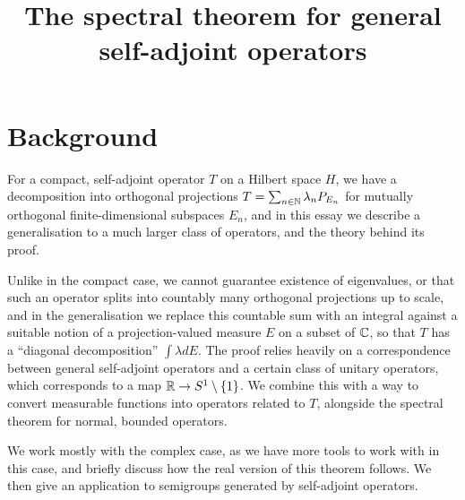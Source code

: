 \documentclass[10pt]{amsart}
\title{The spectral theorem for general self-adjoint operators}
\begin{document}
\maketitle
\section{Background}


For a compact, self-adjoint operator $T$ on a Hilbert space $H$, we have a decomposition into orthogonal projections $T = \sum_{n \in \mathbb{N}}\lambda_n P_{E_n}$ for mutually orthogonal finite-dimensional subspaces $E_n$, and in this essay we describe a generalisation to a much larger class of operators, and the theory behind its proof. 

Unlike in the compact case, we cannot guarantee existence of eigenvalues, or that such an operator splits into countably many orthogonal projections up to scale, and in the generalisation we replace this countable sum with an integral against a suitable notion of a projection-valued measure $E$ on a subset of $\mathbb{C}$, so that $T$ has a ``diagonal decomposition'' $\int \lambda dE$. The proof relies heavily on a correspondence between general self-adjoint operators and a certain class of unitary operators, which corresponds to a map $\mathbb{R} \to S^1 \setminus \left\{  1  \right\}$. We combine this with a way to convert measurable functions into operators related to $T$, alongside the spectral theorem for normal, bounded operators.

We work mostly with the complex case, as we have more tools to work with in this case, and briefly discuss how the real version of this theorem follows. We then give an application to semigroups generated by self-adjoint operators.


\end{document}
